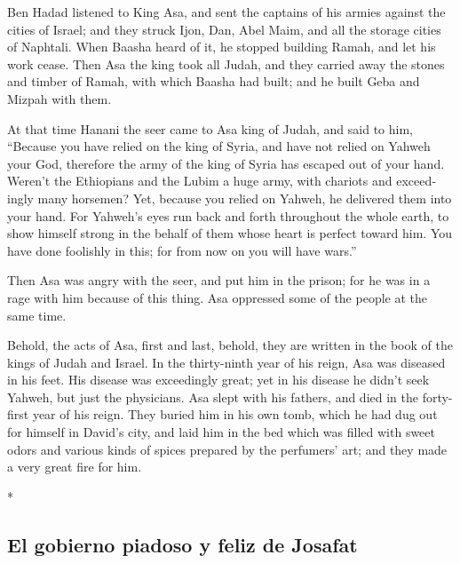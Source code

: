 \begin{paracol}{2}
\begin{otherlanguage}{english}
 Ben Hadad listened to King Asa, and sent the captains of
his armies against the cities of Israel; and they struck Ijon, Dan, Abel
Maim, and all the storage cities of Naphtali.  When Baasha
heard of it, he stopped building Ramah, and let his work cease.
 Then Asa the king took all Judah, and they carried away
the stones and timber of Ramah, with which Baasha had built; and he
built Geba and Mizpah with them.

 At that time Hanani the seer came to Asa king of Judah,
and said to him, ``Because you have relied on the king of Syria, and
have not relied on Yahweh your God, therefore the army of the king of
Syria has escaped out of your hand.  Weren't the
Ethiopians and the Lubim a huge army, with chariots and exceedingly many
horsemen? Yet, because you relied on Yahweh, he delivered them into your
hand.  For Yahweh's eyes run back and forth throughout the
whole earth, to show himself strong in the behalf of them whose heart is
perfect toward him. You have done foolishly in this; for from now on you
will have wars.''

 Then Asa was angry with the seer, and put him in the
prison; for he was in a rage with him because of this thing. Asa
oppressed some of the people at the same time.

 Behold, the acts of Asa, first and last, behold, they
are written in the book of the kings of Judah and Israel.
 In the thirty-ninth year of his reign, Asa was diseased
in his feet. His disease was exceedingly great; yet in his disease he
didn't seek Yahweh, but just the physicians.  Asa slept
with his fathers, and died in the forty-first year of his reign.
 They buried him in his own tomb, which he had dug out
for himself in David's city, and laid him in the bed which was filled
with sweet odors and various kinds of spices prepared by the perfumers'
art; and they made a very great fire for him.

\end{otherlanguage}

\switchcolumn[0]*

\hypertarget{el-gobierno-piadoso-y-feliz-de-josafat}{%
\subsection{El gobierno piadoso y feliz de
Josafat}\label{el-gobierno-piadoso-y-feliz-de-josafat}}


\end{paracol}
